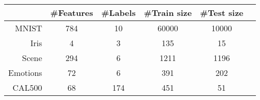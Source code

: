 \begin{tabular}{r|ccccc}
& \#Features & \#Labels & \#Train size & \#Test size \\
\hline
MNIST & 784 & 10 & 60000 & 10000 \\
Iris & 4 & 3 & 135 & 15 \\
Scene & 294 & 6 & 1211 & 1196 \\
Emotions & 72 & 6 & 391 & 202 \\
CAL500 & 68 & 174 & 451 & 51 \\
\end{tabular}
